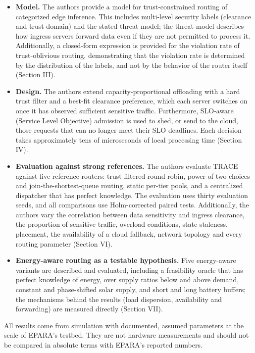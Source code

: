 \documentclass[journal]{IEEEtran}
\begin{document}
\begin{itemize}
\item
  \textbf{Model.} The authors provide a model for trust-constrained routing of categorized edge inference. This includes multi-level security labels (clearance and trust domain) and the stated threat model; the threat model describes how ingress servers forward data even if they are not permitted to process it. Additionally, a closed-form expression is provided for the violation rate of trust-oblivious routing, demonstrating that the violation rate is determined by the distribution of the labels, and not by the behavior of the router itself (Section III).
\item
  \textbf{Design.} The authors extend capacity-proportional offloading with a hard trust filter and a best-fit clearance preference, which each server switches on once it has observed sufficient sensitive traffic. Furthermore, SLO-aware (Service Level Objective) admission is used to shed, or send to the cloud, those requests that can no longer meet their SLO deadlines. Each decision takes approximately tens of microseconds of local processing time (Section IV).
\item
  \textbf{Evaluation against strong references.} The authors evaluate TRACE against five reference routers: trust-filtered round-robin, power-of-two-choices and join-the-shortest-queue routing, static per-tier pools, and a centralized dispatcher that has perfect knowledge. The evaluation uses thirty evaluation seeds, and all comparisons use Holm-corrected paired tests. Additionally, the authors vary the correlation between data sensitivity and ingress clearance, the proportion of sensitive traffic, overload conditions, state staleness, placement, the availability of a cloud fallback, network topology and every routing parameter (Section VI).
\item
  \textbf{Energy-aware routing as a testable hypothesis.} Five energy-aware variants are described and evaluated, including a feasibility oracle that has perfect knowledge of energy, over supply ratios below and above demand, constant and phase-shifted solar supply, and short and long battery buffers; the mechanisms behind the results (load dispersion, availability and forwarding) are measured directly (Section VII).
\end{itemize}

All results come from simulation with documented, assumed parameters at the scale of EPARA's testbed. They are not hardware measurements and should not be compared in absolute terms with EPARA's reported numbers.
\end{document}

